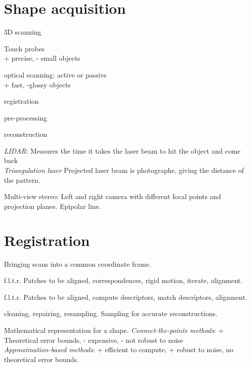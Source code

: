 \begin{compactdesc}
	\section{Shape acquisition}
	\begin{enumerate*}[label=\protect\circled{\arabic*},itemjoin=]
		\item 3D scanning\\
			\begin{enumerate*}[label=\quad\protect\circled{\alph*},itemjoin=]
				\item Touch probes\\
					\mbox{\qquad}+ precise, - small objects\\
				\item optical scanning: active or passive\\
					\mbox{\qquad}+ fast, -glossy objects\\
			\end{enumerate*}
		\item registration\\
		\item pre-processing\\
		\item reconstruction
	\end{enumerate*}
\item[\lp{optical scanning - active systems}]\mbox\\
	\emph{LIDAR}: Measures the time it takes the laser beam to hit the object and come back\\
	\emph{Triangulation laser} Projected laser beam is photographe, giving the distance of the pattern.
\item[\lp{Optical scanning - passive systems}]
	Multi-view stereo: Left and right camera with different focal points and projection planes. Epipolar line.
	\section{Registration}
	Bringing scans into a common coordinate frame.
\item[\lp{Iterative closest point algorithms}]\mbox\\
	f.l.t.r. Patches to be aligned, correspondences, rigid motion, iterate, alignment.
\item[\lp{Feature-based methods}]\mbox\\
	f.l.t.r. Patches to be aligned, compute descriptors, match descriptors, alignment.
\item[\lp{Pre-processing}] cleaning, repairing, resampling. Sampling for accurate reconstructions. 
\item[\lp{Reconstruction}] Mathematical representation for a shape.
	\emph{Connect-the-points methods}:
	+ Theoretical error bounds, - expensive, - not robust to noise\\
	\emph{Approximation-based methods}:
	+ efficient to compute, + robust to noise, no theoretical error bounds.

\end{compactdesc}
